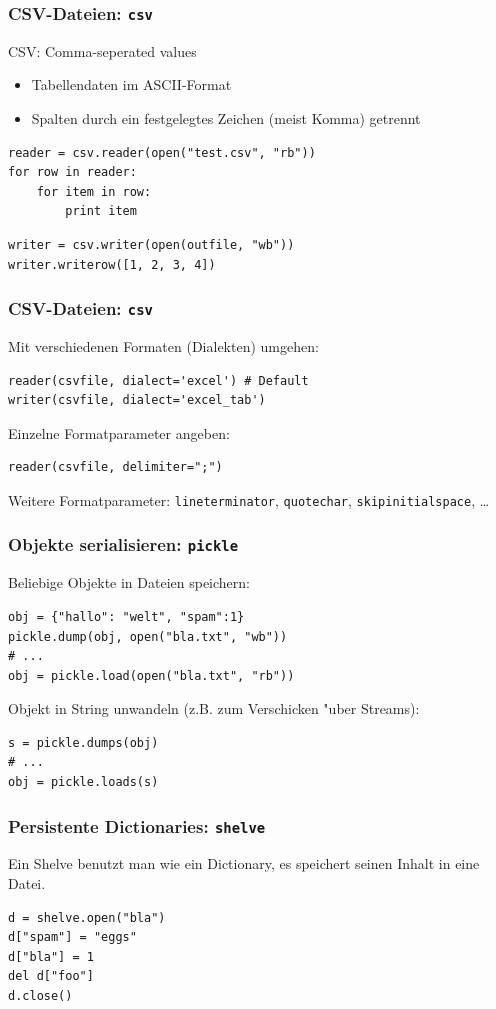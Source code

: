 \begin{frame}[fragile]
\frametitle{CSV-Dateien: \texttt{csv}}
CSV: Comma-seperated values
\begin{itemize}
\item Tabellendaten im ASCII-Format
\item Spalten durch ein festgelegtes Zeichen (meist Komma) getrennt
\end{itemize}
\begin{lstlisting}[style=Python]
reader = csv.reader(open("test.csv", "rb"))
for row in reader:
    for item in row: 
        print item
\end{lstlisting}
\begin{lstlisting}[style=Python]
writer = csv.writer(open(outfile, "wb"))
writer.writerow([1, 2, 3, 4])
\end{lstlisting}
\end{frame}

\begin{frame}[fragile]
\frametitle{CSV-Dateien: \texttt{csv}}
Mit verschiedenen Formaten (Dialekten) umgehen:
\begin{lstlisting}[style=Python]
reader(csvfile, dialect='excel') # Default
writer(csvfile, dialect='excel_tab')
\end{lstlisting}
\vspace*{3mm}
Einzelne Formatparameter angeben:
\begin{lstlisting}[style=Python]
reader(csvfile, delimiter=";")
\end{lstlisting}
Weitere Formatparameter: \texttt{lineterminator}, \texttt{quotechar}, \texttt{skipinitialspace}, \dots
\end{frame}

\begin{frame}[fragile]
\frametitle{Objekte serialisieren: \texttt{pickle}}
Beliebige Objekte in Dateien speichern:
\begin{lstlisting}[style=Python]
obj = {"hallo": "welt", "spam":1}
pickle.dump(obj, open("bla.txt", "wb"))
# ...
obj = pickle.load(open("bla.txt", "rb"))
\end{lstlisting}
Objekt in String unwandeln (z.B. zum Verschicken "uber Streams):
\begin{lstlisting}[style=Python]
s = pickle.dumps(obj)
# ...
obj = pickle.loads(s)
\end{lstlisting}
\end{frame}

\begin{frame}[fragile]
\frametitle{Persistente Dictionaries: \texttt{shelve}}
Ein Shelve benutzt man wie ein Dictionary, es speichert seinen Inhalt in eine Datei.
\begin{lstlisting}[style=Python]
d = shelve.open("bla")
d["spam"] = "eggs"
d["bla"] = 1
del d["foo"]   
d.close()  
\end{lstlisting}
\end{frame}

